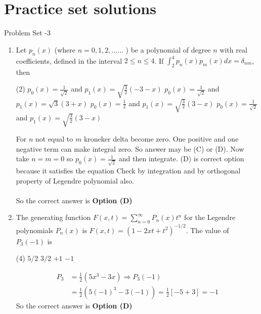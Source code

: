 \chapter{Practice set solutions}
\begin{abox}
	Problem Set -3
\end{abox}
\begin{enumerate}[label=\color{ocre}\textbf{\arabic*.}]
	\item  Let $p_{n}(x)$ (where $n=0,1,2, \ldots \ldots$ ) be a polynomial of degree $n$ with real coefficients, defined in the interval $2 \leq n \leq 4$. If $\int_{2}^{4} p_{n}(x) p_{m}(x) d x=\delta_{n m}$, then
	{}
	\begin{tasks}(2)
		\task[\textbf{A.}] $p_{0}(x)=\frac{1}{\sqrt{2}}$ and $p_{1}(x)=\sqrt{\frac{3}{2}}(-3-x)$
		\task[\textbf{B.}]  $p_{0}(x)=\frac{1}{\sqrt{2}}$ and $p_{1}(x)=\sqrt{3}(3+x)$
		\task[\textbf{C.}] $p_{0}(x)=\frac{1}{2}$ and $p_{1}(x)=\sqrt{\frac{3}{2}}(3-x)$
		\task[\textbf{D.}] $p_{0}(x)=\frac{1}{\sqrt{2}}$ and $p_{1}(x)=\sqrt{\frac{3}{2}}(3-x)$
	\end{tasks}
	\begin{answer}
		For $n$ not equal to $m$ kroneker delta become zero. One positive and one negative term can make integral zero. So answer may be (C) or (D). Now take $n=m=0$ so $p_{0}(x)=\frac{1}{\sqrt{2}}$ and then integrate. (D) is correct option because it satisfies the equation Check by integration and by orthogonal property of Legendre polynomial also.\\\\
		So the correct answer is \textbf{Option (D)}
	\end{answer}
	\item  The generating function $F(x, t)=\sum_{n=0}^{\infty} P_{n}(x) t^{n}$ for the Legendre polynomials $P_{n}(x)$ is $F(x, t)=\left(1-2 x t+t^{2}\right)^{-1 / 2}$. The value of $P_{3}(-1)$ is
	{}
	\begin{tasks}(4)
		\task[\textbf{A.}] $5 / 2$
		\task[\textbf{B.}] $3 / 2$
		\task[\textbf{C.}] $+1$
		\task[\textbf{D.}] $-1$
	\end{tasks}
	\begin{answer}
		\begin{align*}
		P_{3}&=\frac{1}{2}\left(5 x^{3}-3 x\right) \Rightarrow P_{3}(-1)\\&=\frac{1}{2}\left(5(-1)^{3}-3(-1)\right)=\frac{1}{2}[-5+3]=-1
		\end{align*}
		So the correct answer is \textbf{Option (D)}

\end{answer}
\end{enumerate}
